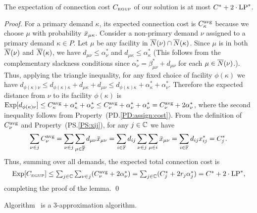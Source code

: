 \documentclass{llncs}
\begin{document}
\begin{lemma}\label{lemma:3dist}
The expectation of connection cost $C_{\mbox{\tiny\rm EGUP}}$ of our solution
is at most  $C^\ast+2\cdot\mbox{\rm LP}^\ast$.
\end{lemma}
\begin{proof}
  For a primary demand $\kappa$, its expected connection cost is
  $C_{\kappa}^{{\mbox{\scriptsize\rm avg}}}$ because we choose  $\mu$ with
  probability ${\bar x}_{\mu\kappa}$.
  Consider a non-primary demand $\nu$ assigned to a primary demand
  $\kappa\in P$. Let $\mu$ be any facility in ${\overline{N}}(\nu) \cap
  {\overline{N}}(\kappa)$.  Since $\mu$ is in both ${\overline{N}}(\nu)$ and
  ${\overline{N}}(\kappa)$, we have $d_{\mu\nu} \leq \alpha_{\nu}^\ast$ and
  $d_{\mu\kappa} \leq \alpha_{\kappa}^\ast$ (This follows from the
  complementary slackness conditions since
  $\alpha_{\nu}^\ast=\beta_{\mu\nu}^\ast + d_{\mu\nu}$ for each
  $\mu\in {\overline{N}}(\nu)$.). Thus, applying the triangle inequality, for
  any fixed choice of facility $\phi(\kappa)$ we have
$d_{\phi(\kappa)\nu} \leq d_{\phi(\kappa)\kappa}+d_{\mu\kappa}+d_{\mu\nu}
    \leq d_{\phi(\kappa)\kappa} + \alpha_{\kappa}^\ast + \alpha_{\nu}^\ast$.
%
Therefore the expected distance from $\nu$ to its facility $\phi(\kappa)$ is 
$\mbox{\rm Exp}[  d_{\phi(\kappa)\nu}   ] \le C^{{\mbox{\scriptsize\rm avg}}}_{\kappa} + \alpha_{\kappa}^\ast + \alpha_{\nu}^\ast 
  \leq C^{{\mbox{\scriptsize\rm avg}}}_{\nu} + \alpha_{\nu}^\ast + \alpha_{\nu}^\ast
   = C^{{\mbox{\scriptsize\rm avg}}}_{\nu} + 2\alpha_{\nu}^\ast$,
%
  where the second inequality follows from Property~(PD.\ref{PD:assign:cost}).  
From the definition of $C^{{\mbox{\scriptsize\rm avg}}}_{\nu}$ and Property~(PS.\ref{PS:xij}), for any $j\in \mathbb{C}$ 
we have
%
\begin{equation*}
\sum_{\nu\in j} C^{{\mbox{\scriptsize\rm avg}}}_{\nu} = \sum_{\nu\in j}\sum_{\mu\in\overline{\mathbb{F}}}d_{\mu\nu}{\bar x}_{\mu\nu}
 			= \sum_{i\in\mathbb{F}} d_{ij}\sum_{\nu\in j}\sum_{\mu\in i}{\bar x}_{\mu\nu}
			= \sum_{i\in\mathbb{F}} d_{ij}x^\ast_{ij} 
			= C^\ast_j.
\end{equation*}
% 
Thus, summing over all demands, the expected total connection cost is
%
\begin{equation*}
    \mbox{\rm Exp}[C_{\mbox{\tiny\rm EGUP}}] \le 
			\textstyle{\sum_{j\in\mathbb{C}} \sum_{\nu\in j}} (C^{{\mbox{\scriptsize\rm avg}}}_{\nu} + 2\alpha_{\nu}^\ast) 
    	= \textstyle{\sum_{j\in\mathbb{C}}} (C_j^\ast + 2r_j\alpha_j^\ast)
 		= C^\ast + 2\cdot\mbox{\rm LP}^\ast,
\end{equation*}
%
completing the proof of the lemma.
\qed
\end{proof}


\begin{theorem}
Algorithm~{\EGUP} is a $3$-approximation algorithm.
\end{theorem}
\end{document}
